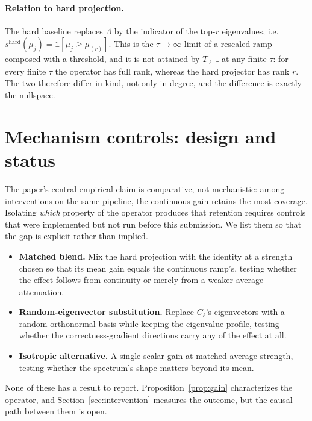 \documentclass{article}
\newcommand{\Cbar}{\bar C}
\begin{document}
\paragraph{Relation to hard projection.} The hard baseline replaces $\Lambda$ by the indicator of the top-$r$ eigenvalues, i.e.\ $s^{\text{hard}}(\mu_j) = \mathbb{1}[\mu_j \ge \mu_{(r)}]$. This is the $\tau\to\infty$ limit of a rescaled ramp composed with a threshold, and it is not attained by $T_{\ell,\tau}$ at any finite $\tau$: for every finite $\tau$ the operator has full rank, whereas the hard projector has rank $r$. The two therefore differ in kind, not only in degree, and the difference is exactly the nullspace.

\section{Mechanism controls: design and status}
\label{app:controls}

The paper's central empirical claim is comparative, not mechanistic: among interventions on the same pipeline, the continuous gain retains the most coverage. Isolating \emph{which} property of the operator produces that retention requires controls that were implemented but not run before this submission. We list them so that the gap is explicit rather than implied.
\begin{itemize}\itemsep2pt
\item \textbf{Matched blend.} Mix the hard projection with the identity at a strength chosen so that its mean gain equals the continuous ramp's, testing whether the effect follows from continuity or merely from a weaker average attenuation.
\item \textbf{Random-eigenvector substitution.} Replace $\Cbar_\ell$'s eigenvectors with a random orthonormal basis while keeping the eigenvalue profile, testing whether the correctness-gradient directions carry any of the effect at all.
\item \textbf{Isotropic alternative.} A single scalar gain at matched average strength, testing whether the spectrum's shape matters beyond its mean.
\end{itemize}
None of these has a result to report. Proposition~\ref{prop:gain} characterizes the operator, and Section~\ref{sec:intervention} measures the outcome, but the causal path between them is open.
\end{document}
